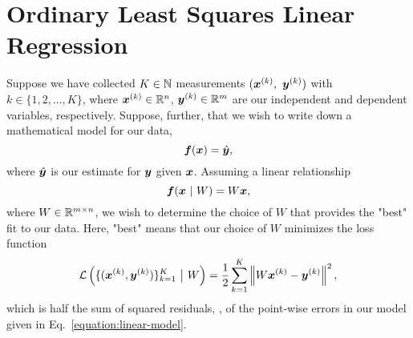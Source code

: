 \section{Ordinary Least Squares Linear Regression}
\label{section:ordinary-least-squares}
%
%
Suppose we have collected $K \in \mathbb{N}$ measurements $(\bm{x}^{(k)},~\bm{y}^{(k)})$ with $k \in \{1, 2, \dots, K\}$,
where $\bm{x}^{(k)} \in \mathbb{R}^n$, $\bm{y}^{(k)} \in \mathbb{R}^m$ are our independent and dependent variables, respectively.
Suppose, further, that we wish to write down a mathematical model for our data,
%
\begin{equation}
    \bm{f}(\bm{x}) = \hat{\bm{y}},
\end{equation}
%
where $\hat{\bm{y}}$ is our estimate for $\bm{y}$ given $\bm{x}$.
Assuming a linear relationship
%
\begin{equation}
    \label{equation:linear-model}
    \bm{f}(\bm{x}~|~W) = W \bm{x},
\end{equation}
%
where $W \in \mathbb{R}^{m \times n}$, we wish to determine the choice of $W$ that provides the "best" fit to our data.
Here, "best" means that our choice of $W$ minimizes the loss function
%
\begin{equation}
    \mathcal{L}\left(\{(\bm{x}^{(k)}, \bm{y}^{(k)})\}_{k=1}^K ~\big{|}~ W\right) = \frac{1}{2} \sum_{k=1}^K \left\| W \bm{x}^{(k)} - \bm{y}^{(k)} \right\|^2,
\end{equation}
%
which is half the sum of squared residuals, \ie, of the point-wise errors in our model given in Eq.~\eqref{equation:linear-model}.

